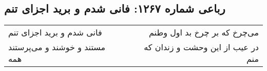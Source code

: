 \begin{center}
\section*{رباعی شماره ۱۲۶۷: فانی شدم و برید اجزای تنم}
\label{sec:1267}
\begin{longtable}{l p{0.5cm} r}
فانی شدم و برید اجزای تنم
&&
می‌چرخ که بر چرخ بد اول وطنم
\\
مستند و خوشند و می‌پرستند همه
&&
در عیب از این وحشت و زندان که منم
\\
\end{longtable}
\end{center}
